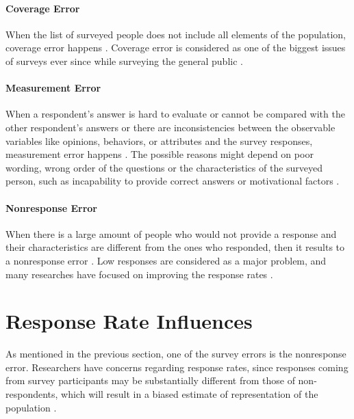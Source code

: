 \paragraph{Coverage Error}
When the list of surveyed people does not include all elements of the population, coverage error happens \citep[page 9]{Dillman2006}. Coverage error is considered as one of the biggest issues of surveys ever since while surveying the general public \citep{Dillman1991}.

\paragraph{Measurement Error}
When a respondent's answer is hard to evaluate or cannot be compared with the other respondent's answers or there are inconsistencies between the observable variables like opinions, behaviors, or attributes and the survey responses, measurement error happens \citetext{\citealp[page 9]{Dillman2006}; \citealp{Dillman1991}}. The possible reasons might depend on poor wording, wrong order of the questions or the characteristics of the surveyed person, such as incapability to provide correct answers or motivational factors \citep{Dillman1991}.

\paragraph{Nonresponse Error}
When there is a large amount of people who would not provide a response and their characteristics are different from the ones who responded, then it results to a nonresponse error \citep[page 9]{Dillman2006}. Low responses are considered as a major problem, and many researches have focused on improving the response rates \citep{Dillman1991}.

\section{Response Rate Influences}
\label{sec:2.2:ResRatInf}

As mentioned in the previous section, one of the survey errors is the nonresponse error. Researchers have concerns regarding response rates, since responses coming from survey participants may be substantially different from those of non-respondents, which will result in a biased estimate of representation of the population \citep{Bogen1996}.
\vspace{1cm}

